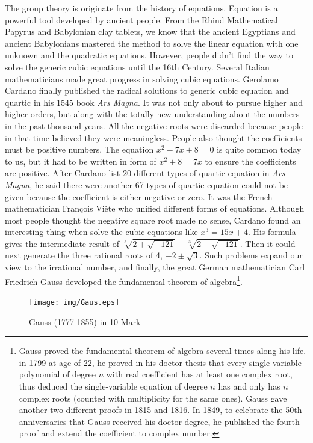 \documentclass{article}
\begin{document}
The group theory is originate from the history of equations. Equation is a powerful tool developed by ancient people. From the Rhind Mathematical Papyrus and Babylonian clay tablets, we know that the ancient Egyptians and ancient Babylonians mastered the method to solve the linear equation with one unknown and the quadratic equations. However, people didn't find the way to solve the generic cubic equations until the 16th Century. Several Italian mathematicians made great progress in solving cubic equations. Gerolamo Cardano finally published the radical solutions to generic cubic equation and quartic in his 1545 book {\em Ars Magna}. It was not only about to pursue higher and higher orders, but along with the totally new understanding about the numbers in the past thousand years. All the negative roots were discarded because people in that time believed they were meaningless. People also thought the coefficients must be positive numbers. The equation $x^2 - 7x + 8 = 0$ is quite common today to us, but it had to be written in form of $x^2 + 8 = 7x$ to ensure the coefficients are positive. After Cardano list 20 different types of quartic equation in {\em Ars Magna}, he said there were another 67 types of quartic equation could not be given because the coefficient is either negative or zero\cite{HanXueTao2012}. It was the French mathematician François Viète who unified different forms of equations. Although most people thought the negative square root made no sense, Cardano found an interesting thing when solve the cubic equations like $x^3 = 15x +4$. His formula gives the intermediate result of $\sqrt[3]{2 + \sqrt{-121}} + \sqrt[3]{2 - \sqrt{-121}}$. Then it could next generate the three rational roots of 4, $-2 \pm \sqrt{3}$. Such problems expand our view to the irrational number, and finally, the great German mathematician Carl Friedrich Gauss developed the fundamental theorem of algebra\footnote{Gauss proved the fundamental theorem of algebra several times along his life. in 1799 at age of 22, he proved in his doctor thesis that every single-variable polynomial of degree $n$ with real coefficient has at least one complex root, thus deduced the single-variable equation of degree $n$ has and only has $n$ complex roots (counted with multiplicity for the same ones). Gauss gave another two different proofs in 1815 and 1816. In 1849, to celebrate the 50th anniversaries that Gauss received his doctor degree, he published the fourth proof and extend the coefficient to complex number.}.

\begin{figure}[htbp]
 \centering
 \texttt{[image: img/Gaus.eps]}
 \captionsetup{labelformat=empty}
 \caption{Gauss (1777-1855) in 10 Mark}
 \label{fig:Gauss}
\end{figure}
\end{document}
